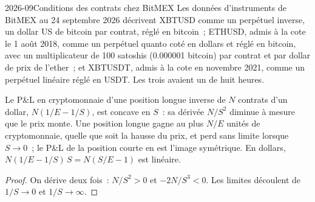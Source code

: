 \begin{dated}{2026-09}{Conditions des contrats chez BitMEX}\label{dat:m3:perpetual-futures:terms}
Les données d'instruments de BitMEX au 24 septembre 2026 décrivent XBTUSD comme un perpétuel inverse, un dollar US de bitcoin par
contrat, réglé en bitcoin~; ETHUSD, admis à la cote le 1 août 2018, comme un perpétuel quanto coté en dollars et réglé en
bitcoin, avec un multiplicateur de 100 satoshis (0.000001 bitcoin) par contrat et par dollar de prix de l'ether~; et XBTUSDT,
admis à la cote en novembre 2021, comme un perpétuel linéaire réglé en USDT. Les trois avaient un  de huit heures.
\end{dated}

\begin{proposition}\label{prop:m3:perpetual-futures:inverse}
Le P\&L en cryptomonnaie d'une position longue inverse de $N$ contrats d'un dollar, $N(1/E - 1/S)$, est concave en $S$~: sa
dérivée $N/S^2$ diminue à mesure que le prix monte. Une position longue gagne au plus $N/E$ unités de cryptomonnaie, quelle que soit la hausse du prix, et perd
sans limite lorsque $S \to 0$~; le P\&L de la position courte en est l'image symétrique. En dollars, $N(1/E - 1/S)\,S = N(S/E - 1)$ est
linéaire.
\end{proposition}

\begin{proof}
On dérive deux fois~: $N/S^2 > 0$ et $-2N/S^3 < 0$. Les limites découlent de $1/S \to 0$ et $1/S \to \infty$.
\end{proof}

